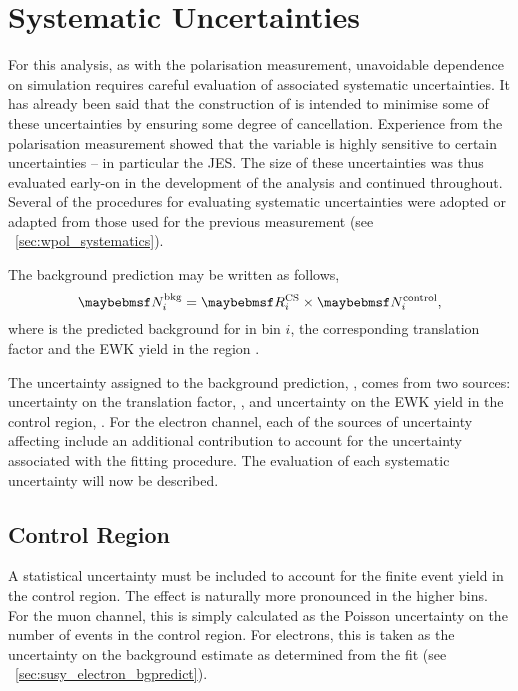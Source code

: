 \section{Systematic Uncertainties}
\label{sec:susy_systematics}
For this analysis, as with the \PW polarisation measurement, unavoidable
dependence on simulation requires careful evaluation of associated systematic
uncertainties. It has already been said that the construction of \RCS is
intended to minimise some of these uncertainties by ensuring some degree of
cancellation. Experience from the \PW polarisation measurement showed that the
\LP variable is highly sensitive to certain uncertainties -- in particular the
\ac{JES}. The size of these uncertainties was thus evaluated early-on in the
development of the analysis and continued throughout. Several of the procedures
for evaluating systematic uncertainties were adopted or adapted from those used
for the previous measurement (see \sec~\ref{sec:wpol_systematics}).

The background prediction may be written as follows,
\begin{equation*}
\NBkgi = \RCSi \times \NControli,
\end{equation*}
where \NBkgi is the predicted background for \LPsignal in \STlep bin $i$, \RCSi
the corresponding translation factor and \NControli the \ac{EWK} yield in the
region \LPcontrol.

The uncertainty assigned to the background prediction, \NBkg, comes from two
sources: uncertainty on the translation factor, \RCS, and uncertainty on the
\ac{EWK} yield in the control region, \NControl. For the electron channel, each
of the sources of uncertainty affecting \RCS include an additional contribution
to account for the uncertainty associated with the fitting procedure. The
evaluation of each systematic uncertainty will now be described.

\subsection{Control Region \texorpdfstring{\LPcontrol}{\LPcontrolBM}}
A statistical uncertainty must be included to account for the finite event yield
in the control region. The effect is naturally more pronounced in the higher
\STlep bins. For the muon channel, this is simply calculated as the Poisson
uncertainty on the number of events in the control region. For electrons, this
is taken as the uncertainty on the background estimate as determined from the
fit (see \sec~\ref{sec:susy_electron_bgpredict}).

